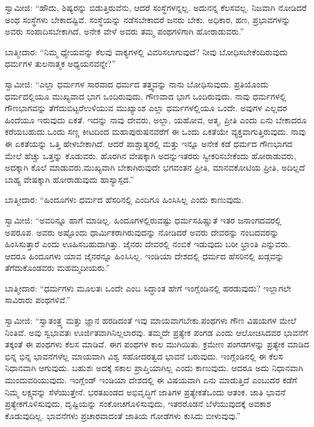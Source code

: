 ಸ್ವಾಮೀಜಿ: “ಹೌದು, ಶಿಷ್ಯರನ್ನು ಬಿಡುತ್ತಿರುವೆನು, ಆದರೆ ಸಂಸ್ಥೆಗಳನ್ನಲ್ಲ. ಅದು\break ನನ್ನ ಕೆಲಸವಲ್ಲ. ನಿಜವಾಗಿ ನೋಡಿದರೆ ಅಂಥ ಸಂಸ್ಥೆಗಳು ಬೇಕಾದಷ್ಟಿವೆ. ಸಂಸ್ಥೆಯನ್ನು ನಡೆಸಬೇಕಾದರೆ ಜನರು ಬೇಕು. ಅಧಿಕಾರ, ಹಣ, ಪ್ರಭಾವಗಳನ್ನು ಅವರು ಸಂಪಾದಿಸಬೇಕಾಗಿದೆ. ಅನೇಕ ವೇಳೆ ಅವರು ತಮ್ಮ ಪಂಥಗಳಿಗಾಗಿ ಹೋರಾಡುವರು.”

\vskip 0.4cm

ಬಾತ್ಮೀದಾರ: “ನಿಮ್ಮ ಧ್ಯೇಯವನ್ನು ಕೆಲವು ವಾಕ್ಯಗಳಲ್ಲಿ ವಿವರಿಸಲಾಗುವುದೆ? ನೀವು ಬೋಧಿಸಬೇಕೆಂದಿರುವುದು ಧರ್ಮಗಳ ತುಲನಾತ್ಮಕ ಅಧ್ಯಯನವನ್ನೇ?”

\vskip 0.4cm

ಸ್ವಾಮೀಜಿ: “ಎಲ್ಲಾ ಧರ್ಮಗಳ ಸಾರವಾದ ಧರ್ಮದ ತತ್ತ್ವವನ್ನು ನಾನು ಬೋಧಿಸುವುದು. ಪ್ರತಿಯೊಂದು ಧರ್ಮದಲ್ಲಿಯೂ ಮುಖ್ಯವಾದ ಭಾಗ ಒಂದಿರುವುದು, ಗೌಣವಾದ ಭಾಗ ಒಂದಿರುವುದು. ನಾವು ಧರ್ಮಗಳಲ್ಲಿ ಗೌಣಭಾಗವನ್ನು ತೆಗೆದುಬಿಟ್ಟರೆ\break ಉಳಿಯುವ ಮುಖ್ಯಾಂಶ ಎಲ್ಲಾ ಧರ್ಮಗಳಲ್ಲಿಯೂ ಒಂದೇ. ಅವುಗಳ ಎಲ್ಲದರ ಹಿಂದೆಯೂ ಇರುವುದು ಏಕತೆ. ಇದನ್ನು ನಾವು ದೇವರು, ಅಲ್ಲಾ, ಯಹೋವ, ಆತ್ಮ, ಪ್ರೀತಿ ಎಂದು ಏನು ಬೇಕಾದರೂ ಕರೆಯಬಹುದು.ಒಂದು ಸಣ್ಣ ಕೀಟದಿಂದ ಮಹಾ\-ಪುರುಷನವರೆಗೆ ಈ ಒಂದು ಏಕತೆಯೇ ವ್ಯಕ್ತವಾಗುತ್ತಿರುವುದು. ನಾವು ಈ ಏಕತೆಯನ್ನು ಒತ್ತಿ ಹೇಳಬೇಕಾಗಿದೆ. ಆದರೆ ಪಾಶ್ಚಾತ್ಯರಲ್ಲಿ ಮತ್ತು ಇನ್ನೂ ಅನೇಕ ಕಡೆ ಧರ್ಮದ ಗೌಣಭಾಗದ ಮೇಲೆ ಹೆಚ್ಚು ಒತ್ತನ್ನು ಕೊಡುವರು. ಹೊರಗಿನ ವೇಷಕ್ಕಾಗಿ ಅದನ್ನು\break ಇತರರು ಸ್ವೀಕರಿಸಬೇಕೆಂದು ಹೋರಾಡುವರು, ಅದಕ್ಕಾಗಿ ಕೊಲೆ ಮಾಡುವರು.\break ಮುಖ್ಯವಾಗಿ ಬೇಕಾಗಿರುವುದೇ ಭಗವಂತನ ಪ್ರೀತಿ, ಮಾನವಕೋಟಿಯ ಪ್ರೀತಿ, ಅದಿಲ್ಲದೆ ಬಾಹ್ಯ ವೇಷಕ್ಕಾಗಿ ಹೋರಾಡುವುದು ಹಾಸ್ಯಾಸ್ಪದ.”

\vskip 0.4cm

ಬಾತ್ಮೀದಾರ: “ಹಿಂದೂಗಳು ಧರ್ಮದ ಹೆಸರಿನಲ್ಲಿ ಎಂದಿಗೂ ಹಿಂಸಿಸಿಲ್ಲ ಎಂದು ಕಾಣುವುದು.

\vskip 0.4cm

ಸ್ವಾಮೀಜಿ: “ಅವರಿನ್ನೂ ಹಾಗೆ ಮಾಡಿಲ್ಲ. ಹಿಂದೂಗಳಲ್ಲಿರುವಷ್ಟು ಧರ್ಮಸಹಿಷ್ಣುತೆ ಇತರ ಜನಾಂಗದವರಲ್ಲಿ ಅಪರೂಪ. ಅವರು ಅಷ್ಟೊಂದು ಧಾರ್ಮಿಕರಾಗಿರುವುದನ್ನು ನೋಡಿದರೆ ಅವರು ದೇವರನ್ನು ನಂಬದವರನ್ನು ಹಿಂಸಿಸುತ್ತಾರೆ ಎಂದು ಊಹಿಸಬಹುದಾಗಿತ್ತು. ಜೈನರು ದೇವರಲ್ಲಿ ನಂಬಿಕೆ ಇಡುವುದು ಬರೀ ಭ್ರಾಂತಿ ಎನ್ನುವರು. ಆದರೂ ಹಿಂದೂಗಳು ಯಾವ ಜೈನರನ್ನೂ ಹಿಂಸಿಸಿಲ್ಲ. ಇಂಡಿಯಾ ದೇಶದಲ್ಲಿ ಧರ್ಮದ ಹೆಸರಿನಲ್ಲಿ ಖಡ್ಗವನ್ನು ತೆಗೆದುಕೊಂಡವರು ಮಹಮ್ಮದೀಯರು.”

ಬಾತ್ಮೀದಾರ: “ಧರ್ಮಗಳು ಮೂಲತಃ ಒಂದೇ ಎಂಬ ಸಿದ್ಧಾಂತ ಹೇಗೆ ಇಂಗ್ಲೆಂಡಿನಲ್ಲಿ ಹರಡುವುದು? ಇಲ್ಲಾಗಲೇ ಸಾವಿರಾರು ಪಂಥಗಳಿವೆ.”

ಸ್ವಾಮೀಜಿ: “ಸ್ವಾತಂತ್ರ್ಯ ಮತ್ತು ಜ್ಞಾನ ಹರಡಿದಂತೆ ಇವು ಮಾಯವಾಗಬೇಕು.\break ಪಂಥಗಳು ಗೌಣ ವಿಷಯಗಳ ಮೇಲೆ ನಿಂತಿವೆ. ಅವು ಸ್ವಭಾವತಃ ಊರ್ಜಿತವಾಗಿ\break ನಿಲ್ಲಲಾರವು. ತಮ್ಮದೇ ಪ್ರತ್ಯೇಕ ಪಂಗಡ ಎಂದು ಆಲೋಚಿಸಿದವರ ಭಾವನೆಗೆ ತಕ್ಕಂತೆ ಈ ಪಂಥಗಳು ಕೆಲಸ ಮಾಡಿವೆ. ಈಗ ಪಂಥಗಳ ಕಾಲ ಮುಗಿಯಿತು. ಕ್ರಮೇಣ ಪಂಗಡಗಳನ್ನು ಪ್ರತ್ಯೇಕ ಮಾಡಿದ ಭಿನ್ನ ಭಿನ್ನ ಭಾವನೆಗಳೆಲ್ಲ ಮಾಯವಾಗಿ ವಿಶ್ವ ಸಹೋದರತ್ವದ ಭಾವನೆ ಬರುವುದು. ಇಂಗ್ಲೆಂಡಿನಲ್ಲಿ ಈ ಕೆಲಸ ನಿಧಾನವಾಗಿ ಆಗುವುದು. ಬಹುಶಃ ಅದಕ್ಕೆ ಸಕಾಲ ಪ್ರಾಪ್ತಿಯಾಗಿಲ್ಲ ಎಂದು ಕಾಣುವುದು. ಆದರೂ ಅದು ನಿಧಾನವಾಗಿ ಮುಂದುವರಿಯುವುದು. ಇಂಗ್ಲೆಂಡ್​ ಇಂಡಿಯಾ ದೇಶದಲ್ಲಿ ಈ ವಿಷಯವಾಗಿ ಏನು ಮಾಡುತ್ತಿದೆ ಎಂಬುದರ ಕಡೆಗೆ ನಿಮ್ಮ ಲಕ್ಷ್ಯವನ್ನು ಸೆಳೆಯುತ್ತೇನೆ. ಭರತಖಂಡದ ಅಭಿವೃದ್ಧಿಗೆ ಜಾತಿಗಳ ಪ್ರತ್ಯೇಕತೆ\break ಒಂದು ಆತಂಕ. ಜಾತಿ ಭಾವನೆ ಪ್ರತ್ಯೇಕಗೊಳಿಸುವುದು, ದೃಷ್ಟಿಯನ್ನು ಸಂಕೋಚಗೊಳಿಸುವುದು, ಇತರರೊಡನೆ ಬೆಳೆಯುವುದಕ್ಕೆ ಅವಕಾಶ ಕೊಡುವುದಿಲ್ಲ. ಭಾವನೆಗಳು ಪ್ರಚಾರ\-ವಾದಂತೆ ಜಾತಿಯ ಗೋಡೆಗಳು ಕುಸಿದು ಬೀಳುವುವು.”

